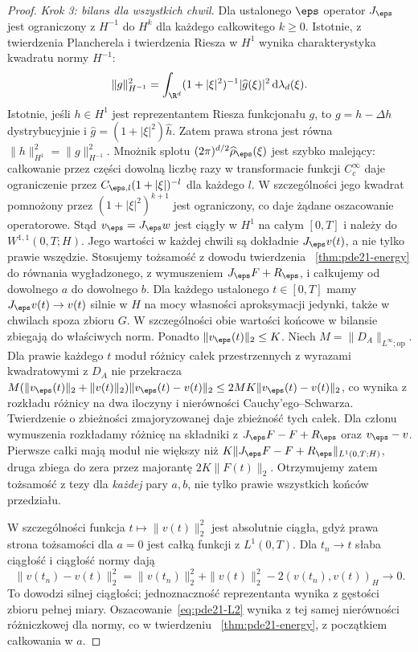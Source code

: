 \begin{proof}
\emph{Krok 3: bilans dla wszystkich chwil.}
Dla ustalonego $\eps$ operator $J_\eps$ jest
ograniczony z $H^{-1}$ do $H^k$ dla każdego
całkowitego $k\ge0$. Istotnie, z twierdzenia
Plancherela i twierdzenia Riesza w $H^1$ wynika
charakterystyka kwadratu normy $H^{-1}$:
\[
 \|g\|_{H^{-1}}^2
 =\int_{\R^d}(1+|\xi|^2)^{-1}|\widehat g(\xi)|^2
 \,\mathrm d\lambda_d(\xi).
\]
Istotnie, jeśli $h\in H^1$ jest reprezentantem
Riesza funkcjonału $g$, to
$g=h-\Delta h$ dystrybucyjnie i
$\widehat g=(1+|\xi|^2)\widehat h$.
Zatem prawa strona jest równa $\|h\|_{H^1}^2
=\|g\|_{H^{-1}}^2$.
Mnożnik splotu $(2\pi)^{d/2}\widehat\rho_\eps(\xi)$
jest szybko malejący: całkowanie przez części
dowolną liczbę razy w transformacie funkcji
$C_c^\infty$ daje ograniczenie przez
$C_{\eps,l}(1+|\xi|)^{-l}$ dla każdego $l$.
W szczególności jego kwadrat pomnożony przez
$(1+|\xi|^2)^{k+1}$ jest ograniczony, co daje
żądane oszacowanie operatorowe.
Stąd $v_\eps=J_\eps w$ jest ciągły w $H^1$
na całym $[0,T]$ i należy do $W^{1,1}(0,T;H)$.
Jego wartości w każdej chwili są dokładnie
$J_\eps v(t)$, a nie tylko prawie wszędzie.
Stosujemy tożsamość z dowodu twierdzenia
~\ref{thm:pde21-energy} do równania wygładzonego,
z wymuszeniem $J_\eps F+R_\eps$, i całkujemy
od dowolnego $a$ do dowolnego $b$.
Dla każdego ustalonego $t\in[0,T]$ mamy
$J_\eps v(t)\to v(t)$ silnie w $H$ na mocy
własności aproksymacji jedynki, także w chwilach
spoza zbioru $G$. W szczególności obie wartości
końcowe w bilansie zbiegają do właściwych norm.
Ponadto $\|v_\eps(t)\|_2\le K$. Niech
$M=\|D_A\|_{L^\infty;\mathrm{op}}$.
Dla prawie każdego $t$ moduł różnicy całek
przestrzennych z wyrazami kwadratowymi
z $D_A$ nie przekracza
$M(\|v_\eps(t)\|_2+\|v(t)\|_2)\|v_\eps(t)-v(t)\|_2
\le2MK\|v_\eps(t)-v(t)\|_2$,
co wynika z rozkładu różnicy na dwa iloczyny
i nierówności Cauchy'ego--Schwarza.
Twierdzenie o zbieżności zmajoryzowanej daje
zbieżność tych całek. Dla członu wymuszenia
rozkładamy różnicę na składniki z
$J_\eps F-F+R_\eps$ oraz $v_\eps-v$.
Pierwsze całki mają moduł nie większy niż
$K\|J_\eps F-F+R_\eps\|_{L^1(0,T;H)}$,
druga zbiega do zera przez majorantę $2K\|F(t)\|_2$.
Otrzymujemy zatem tożsamość z tezy dla \emph{każdej}
pary $a,b$, nie tylko prawie wszystkich końców przedziału.

W szczególności funkcja $t\mapsto\|v(t)\|_2^2$
jest absolutnie ciągła, gdyż prawa strona tożsamości
dla $a=0$ jest całką funkcji z $L^1(0,T)$.
Dla $t_n\to t$ słaba ciągłość i ciągłość normy dają
\[
 \|v(t_n)-v(t)\|_2^2
 =\|v(t_n)\|_2^2+\|v(t)\|_2^2-2(v(t_n),v(t))_H\to0.
\]
To dowodzi silnej ciągłości; jednoznaczność
reprezentanta wynika z gęstości zbioru pełnej miary.
Oszacowanie~\eqref{eq:pde21-L2} wynika z tej samej
nierówności różniczkowej dla normy, co w twierdzeniu
~\ref{thm:pde21-energy}, z początkiem całkowania w $a$.
\end{proof}


